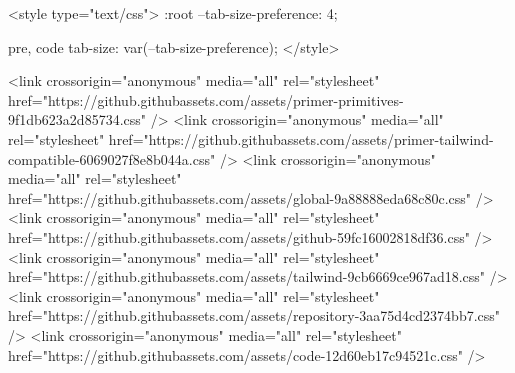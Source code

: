   <style type="text/css">
    :root {
      --tab-size-preference: 4;
    }

    pre, code {
      tab-size: var(--tab-size-preference);
    }
  </style>

    <link crossorigin="anonymous" media="all" rel="stylesheet" href="https://github.githubassets.com/assets/primer-primitives-9f1db623a2d85734.css" />
    <link crossorigin="anonymous" media="all" rel="stylesheet" href="https://github.githubassets.com/assets/primer-tailwind-compatible-6069027f8e8b044a.css" />
    <link crossorigin="anonymous" media="all" rel="stylesheet" href="https://github.githubassets.com/assets/global-9a88888eda68c80c.css" />
    <link crossorigin="anonymous" media="all" rel="stylesheet" href="https://github.githubassets.com/assets/github-59fc16002818df36.css" />
    <link crossorigin="anonymous" media="all" rel="stylesheet" href="https://github.githubassets.com/assets/tailwind-9cb6669ce967ad18.css" />
  <link crossorigin="anonymous" media="all" rel="stylesheet" href="https://github.githubassets.com/assets/repository-3aa75d4cd2374bb7.css" />
<link crossorigin="anonymous" media="all" rel="stylesheet" href="https://github.githubassets.com/assets/code-12d60eb17c94521c.css" />

  

